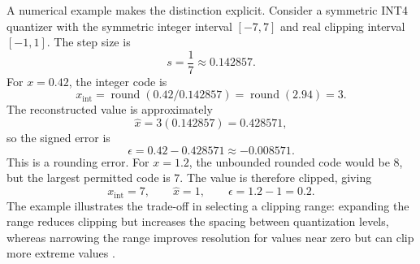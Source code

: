 A numerical example makes the distinction explicit. Consider a
symmetric INT4 quantizer with the symmetric integer interval
\([-7,7]\) and real clipping interval \([-1,1]\). The step size is
\begin{equation}
    s=\frac{1}{7}\approx 0.142857.
    \label{eq:quant-example-step}
\end{equation}
For \(x=0.42\), the integer code is
\begin{equation}
    x_{\mathrm{int}}
    =
    \operatorname{round}(0.42/0.142857)
    =
    \operatorname{round}(2.94)=3.
    \label{eq:quant-example-round}
\end{equation}
The reconstructed value is approximately
\begin{equation}
    \widehat{x}=3(0.142857)=0.428571,
    \label{eq:quant-example-reconstruction}
\end{equation}
so the signed error is
\begin{equation}
    \epsilon=0.42-0.428571\approx -0.008571.
    \label{eq:quant-example-round-error}
\end{equation}
This is a rounding error. For \(x=1.2\), the unbounded rounded code
would be \(8\), but the largest permitted code is \(7\). The value is
therefore clipped, giving
\begin{equation}
    x_{\mathrm{int}}=7,\qquad
    \widehat{x}=1,\qquad
    \epsilon=1.2-1=0.2.
    \label{eq:quant-example-clipping-error}
\end{equation}
The example illustrates the trade-off in selecting a clipping range:
expanding the range reduces clipping but increases the spacing between
quantization levels, whereas narrowing the range improves resolution
for values near zero but can clip more extreme values
\parencite{song2026targetcentricqat,chen2026llmquantization}.


